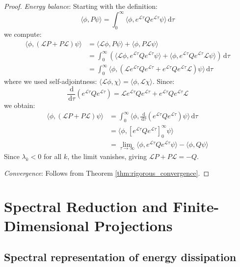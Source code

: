 \documentclass[a4paper,12pt]{article}
\newcommand{\dd}{\,\mathrm{d}}
\newcommand{\inner}[2]{\langle #1, #2 \rangle}
\begin{document}
\begin{proof}
\textit{Energy balance}: Starting with the definition:
\begin{equation}
\inner{\phi}{P\psi} = \int_0^{\infty} \inner{\phi}{e^{\mathcal{L}\tau} Q e^{\mathcal{L}\tau} \psi} \dd\tau
\end{equation}
we compute:
\begin{align}
\inner{\phi}{(\mathcal{L}P + P\mathcal{L})\psi} &= \inner{\mathcal{L}\phi}{P\psi} + \inner{\phi}{P\mathcal{L}\psi}\\
&= \int_0^{\infty} \left(\inner{\mathcal{L}\phi}{e^{\mathcal{L}\tau} Q e^{\mathcal{L}\tau} \psi} + \inner{\phi}{e^{\mathcal{L}\tau} Q e^{\mathcal{L}\tau} \mathcal{L}\psi}\right) \dd\tau\\
&= \int_0^{\infty} \inner{\phi}{(\mathcal{L}e^{\mathcal{L}\tau} Q e^{\mathcal{L}\tau} + e^{\mathcal{L}\tau} Q e^{\mathcal{L}\tau}\mathcal{L})\psi} \dd\tau
\end{align}
where we used self-adjointness: $\inner{\mathcal{L}\phi}{\chi} = \inner{\phi}{\mathcal{L}\chi}$. Since:
\begin{equation}
\frac{\dd}{\dd\tau}(e^{\mathcal{L}\tau} Q e^{\mathcal{L}\tau}) = \mathcal{L}e^{\mathcal{L}\tau} Q e^{\mathcal{L}\tau} + e^{\mathcal{L}\tau} Q e^{\mathcal{L}\tau}\mathcal{L}
\end{equation}
we obtain:
\begin{align}
\inner{\phi}{(\mathcal{L}P + P\mathcal{L})\psi} &= \int_0^{\infty} \inner{\phi}{\frac{\dd}{\dd\tau}(e^{\mathcal{L}\tau} Q e^{\mathcal{L}\tau})\psi} \dd\tau\\
&= \inner{\phi}{\left[e^{\mathcal{L}\tau} Q e^{\mathcal{L}\tau}\right]_0^{\infty}\psi}\\
&= \lim_{\tau \to \infty} \inner{\phi}{e^{\mathcal{L}\tau} Q e^{\mathcal{L}\tau}\psi} - \inner{\phi}{Q\psi}
\end{align}
Since $\lambda_k < 0$ for all $k$, the limit vanishes, giving $\mathcal{L}P + P\mathcal{L} = -Q$.

\textit{Convergence}: Follows from Theorem \ref{thm:rigorous_convergence}.
\end{proof}

\section{Spectral Reduction and Finite-Dimensional Projections}\label{sec:spectral}

\subsection{Spectral representation of energy dissipation}
\end{document}
